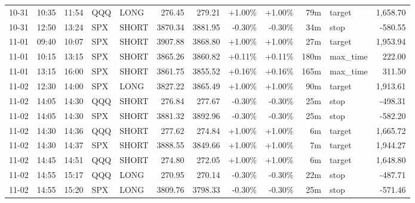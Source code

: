 \documentclass[11pt,a4paper,twoside]{article}
\begin{document}
\begin{center}
\begin{longtable}{>{\color{txtmain}}l l l l l r r r r r >{\color{txtmain}}l r}
10-31 & 10:35 & 11:54 & QQQ & LONG & 276.45 & 279.21 & \textcolor{wingreen}{+1.00\%} & \textcolor{wingreen}{+1.00\%} & 79m & target & \textcolor{wingreen}{1,658.70} \\
10-31 & 12:50 & 13:24 & SPX & SHORT & 3870.34 & 3881.95 & \textcolor{lossred}{-0.30\%} & \textcolor{lossred}{-0.30\%} & 34m & stop & \textcolor{lossred}{-580.55} \\
11-01 & 09:40 & 10:07 & SPX & SHORT & 3907.88 & 3868.80 & \textcolor{wingreen}{+1.00\%} & \textcolor{wingreen}{+1.00\%} & 27m & target & \textcolor{wingreen}{1,953.94} \\
11-01 & 10:15 & 13:15 & SPX & SHORT & 3865.26 & 3860.82 & \textcolor{wingreen}{+0.11\%} & \textcolor{wingreen}{+0.11\%} & 180m & max\_time & \textcolor{wingreen}{222.00} \\
11-01 & 13:15 & 16:00 & SPX & SHORT & 3861.75 & 3855.52 & \textcolor{wingreen}{+0.16\%} & \textcolor{wingreen}{+0.16\%} & 165m & max\_time & \textcolor{wingreen}{311.50} \\
11-02 & 12:30 & 14:00 & SPX & LONG & 3827.22 & 3865.49 & \textcolor{wingreen}{+1.00\%} & \textcolor{wingreen}{+1.00\%} & 90m & target & \textcolor{wingreen}{1,913.61} \\
11-02 & 14:05 & 14:30 & QQQ & SHORT & 276.84 & 277.67 & \textcolor{lossred}{-0.30\%} & \textcolor{lossred}{-0.30\%} & 25m & stop & \textcolor{lossred}{-498.31} \\
11-02 & 14:05 & 14:30 & SPX & SHORT & 3881.32 & 3892.96 & \textcolor{lossred}{-0.30\%} & \textcolor{lossred}{-0.30\%} & 25m & stop & \textcolor{lossred}{-582.20} \\
11-02 & 14:30 & 14:36 & QQQ & SHORT & 277.62 & 274.84 & \textcolor{wingreen}{+1.00\%} & \textcolor{wingreen}{+1.00\%} & 6m & target & \textcolor{wingreen}{1,665.72} \\
11-02 & 14:30 & 14:37 & SPX & SHORT & 3888.55 & 3849.66 & \textcolor{wingreen}{+1.00\%} & \textcolor{wingreen}{+1.00\%} & 7m & target & \textcolor{wingreen}{1,944.27} \\
11-02 & 14:45 & 14:51 & QQQ & SHORT & 274.80 & 272.05 & \textcolor{wingreen}{+1.00\%} & \textcolor{wingreen}{+1.00\%} & 6m & target & \textcolor{wingreen}{1,648.80} \\
11-02 & 14:55 & 15:17 & QQQ & LONG & 270.95 & 270.14 & \textcolor{lossred}{-0.30\%} & \textcolor{lossred}{-0.30\%} & 22m & stop & \textcolor{lossred}{-487.71} \\
11-02 & 14:55 & 15:20 & SPX & LONG & 3809.76 & 3798.33 & \textcolor{lossred}{-0.30\%} & \textcolor{lossred}{-0.30\%} & 25m & stop & \textcolor{lossred}{-571.46} \\

\end{longtable}
\end{center}
\end{document}
